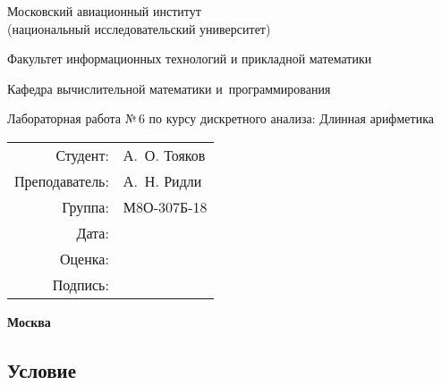 \documentclass[12pt]{article}
\begin{document}
\thispagestyle{empty}
\begin{center}
	\bfseries

	{\Large Московский авиационный институт\\ (национальный исследовательский университет)

	}

	\vspace{48pt}

	{\large Факультет информационных технологий и прикладной математики
	}

	\vspace{36pt}


	{\large Кафедра вычислительной математики и~программирования

	}


	\vspace{48pt}

	{Лабораторная работа №\,6 по курсу дискретного анализа: Длинная арифметика}

\end{center}

\vspace{72pt}

\begin{flushright}
	\begin{tabular}{rl}
		Студент:       & А.\, О. Тояков   \\
		Преподаватель: & А.\, Н. Ридли \\
		Группа:        & М8О-307Б-18      \\
		Дата:          &                 \\
		Оценка:        &                  \\
		Подпись:       &                  \\
	\end{tabular}
\end{flushright}

\vfill

\begin{center}
	\bfseries
	Москва\\
	\the\year
\end{center}

\newpage

\subsection*{Условие}
\end{document}
